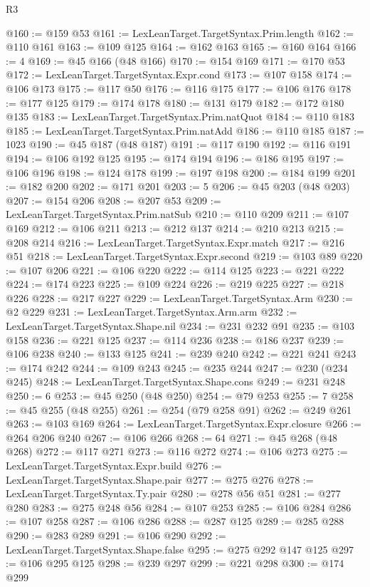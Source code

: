 \begin{lexlean}{R3}
\begin{coremodule}
@160 := @159 @53
@161 := LexLeanTarget.TargetSyntax.Prim.length
@162 := @110 @161
@163 := @109 @125
@164 := @162 @163
@165 := @160 @164
@166 := 4
@169 := @45 @166 (@48 @166)
@170 := @154 @169
@171 := @170 @53
@172 := LexLeanTarget.TargetSyntax.Expr.cond
@173 := @107 @158
@174 := @106 @173
@175 := @117 @50
@176 := @116 @175
@177 := @106 @176
@178 := @177 @125
@179 := @174 @178
@180 := @131 @179
@182 := @172 @180 @135
@183 := LexLeanTarget.TargetSyntax.Prim.natQuot
@184 := @110 @183
@185 := LexLeanTarget.TargetSyntax.Prim.natAdd
@186 := @110 @185
@187 := 1023
@190 := @45 @187 (@48 @187)
@191 := @117 @190
@192 := @116 @191
@194 := @106 @192 @125
@195 := @174 @194
@196 := @186 @195
@197 := @106 @196
@198 := @124 @178
@199 := @197 @198
@200 := @184 @199
@201 := @182 @200
@202 := @171 @201
@203 := 5
@206 := @45 @203 (@48 @203)
@207 := @154 @206
@208 := @207 @53
@209 := LexLeanTarget.TargetSyntax.Prim.natSub
@210 := @110 @209
@211 := @107 @169
@212 := @106 @211
@213 := @212 @137
@214 := @210 @213
@215 := @208 @214
@216 := LexLeanTarget.TargetSyntax.Expr.match
@217 := @216 @51
@218 := LexLeanTarget.TargetSyntax.Expr.second
@219 := @103 @89
@220 := @107 @206
@221 := @106 @220
@222 := @114 @125
@223 := @221 @222
@224 := @174 @223
@225 := @109 @224
@226 := @219 @225
@227 := @218 @226
@228 := @217 @227
@229 := LexLeanTarget.TargetSyntax.Arm
@230 := @2 @229
@231 := LexLeanTarget.TargetSyntax.Arm.arm
@232 := LexLeanTarget.TargetSyntax.Shape.nil
@234 := @231 @232 @91
@235 := @103 @158
@236 := @221 @125
@237 := @114 @236
@238 := @186 @237
@239 := @106 @238
@240 := @133 @125
@241 := @239 @240
@242 := @221 @241
@243 := @174 @242
@244 := @109 @243
@245 := @235 @244
@247 := @230 (@234 @245)
@248 := LexLeanTarget.TargetSyntax.Shape.cons
@249 := @231 @248
@250 := 6
@253 := @45 @250 (@48 @250)
@254 := @79 @253
@255 := 7
@258 := @45 @255 (@48 @255)
@261 := @254 (@79 @258 @91)
@262 := @249 @261
@263 := @103 @169
@264 := LexLeanTarget.TargetSyntax.Expr.closure
@266 := @264 @206 @240
@267 := @106 @266
@268 := 64
@271 := @45 @268 (@48 @268)
@272 := @117 @271
@273 := @116 @272
@274 := @106 @273
@275 := LexLeanTarget.TargetSyntax.Expr.build
@276 := LexLeanTarget.TargetSyntax.Shape.pair
@277 := @275 @276
@278 := LexLeanTarget.TargetSyntax.Ty.pair
@280 := @278 @56 @51
@281 := @277 @280
@283 := @275 @248 @56
@284 := @107 @253
@285 := @106 @284
@286 := @107 @258
@287 := @106 @286
@288 := @287 @125
@289 := @285 @288
@290 := @283 @289
@291 := @106 @290
@292 := LexLeanTarget.TargetSyntax.Shape.false
@295 := @275 @292 @147 @125
@297 := @106 @295 @125
@298 := @239 @297
@299 := @221 @298
@300 := @174 @299

\end{coremodule}
\end{lexlean}
